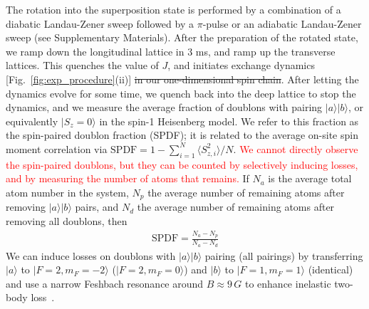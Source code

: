\documentclass[aps,prl,twocolumn,superscriptaddress]{revtex4-1}
\newcommand{\newmat}[1]{\textcolor{red}{#1}}
\newcommand{\rmtxt}[1]{\st{#1}}
\begin{document}
The rotation into the superposition state is performed by a combination of a diabatic Landau-Zener sweep followed by a $\pi$-pulse or an adiabatic Landau-Zener sweep (see Supplementary Materials). After the preparation of the rotated state, we ramp down the longitudinal lattice in 3 ms, and ramp up the transverse lattices. This quenches the value of $J$, and initiates exchange dynamics [Fig.~\ref{fig:exp_procedure}(ii)] \rmtxt{in our one-dimensional spin chain}. After letting the dynamics evolve for some time, we quench back into the deep lattice to stop the dynamics, and we measure the average fraction of doublons with pairing $|a\rangle|b\rangle$, or equivalently $|S_z = 0\rangle$ in the spin-1 Heisenberg model. We refer to this fraction as the spin-paired doublon fraction (SPDF); it is related to the average on-site spin moment correlation via $\text{SPDF} = 1 - \sum_{i=1}^{N} \langle S_{z,i}^2\rangle/N$. \newmat{We cannot directly observe the spin-paired doublons, but they can be counted by selectively inducing losses, and by measuring the number of atoms that remains.} If $N_{a}$ is the average total atom number in the system, $N_{p}$ the average number of remaining atoms after removing $|a\rangle |b\rangle$ pairs, and $N_{d}$ the average number of remaining atoms after removing all doublons, then
\begin{eqnarray}
    \text{SPDF} = \frac{N_a - N_p}{N_a-N_d}
\end{eqnarray}
We can induce losses on doublons with $|a\rangle |b\rangle$ pairing (all pairings) by transferring $|a\rangle$ to $|F=2,m_F=-2\rangle$ ($|F=2,m_F=0\rangle$) and $|b\rangle$ to $|F=1,m_F=1\rangle$ (identical) and use a narrow Feshbach resonance around $B \approx 9\,G$ to enhance inelastic two-body loss~\cite{kaufman2009radio}. 
\end{document}
